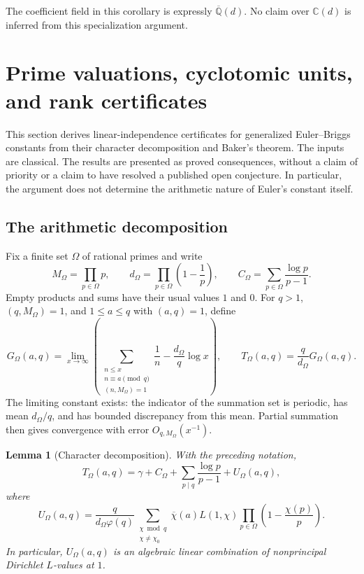 \documentclass[11pt,a4paper]{article}
\newtheorem{lemma}[theorem]{Lemma}
\theoremstyle{definition}
\theoremstyle{remark}
\numberwithin{equation}{section}
\begin{document}
The coefficient field in this corollary is expressly
$\overline{\mathbb Q}(d)$. No claim over $\mathbb C(d)$ is inferred from
this specialization argument.

\section{Prime valuations, cyclotomic units, and rank certificates}
\label{p1:nt-section}

This section derives linear-independence certificates for generalized
Euler--Briggs constants from their character decomposition and Baker's
theorem.  The inputs are classical.  The results are presented as proved
consequences, without a claim of priority or a claim to have resolved a
published open conjecture.  In particular, the argument does not determine
the arithmetic nature of Euler's constant itself.

\subsection{The arithmetic decomposition}
\label{p1:nt-decomposition-section}

Fix a finite set $\Omega$ of rational primes and write
\[
 M_\Omega=\prod_{p\in\Omega}p,
 \qquad d_\Omega=\prod_{p\in\Omega}\left(1-\frac1p\right),
 \qquad C_\Omega=\sum_{p\in\Omega}\frac{\log p}{p-1}.
\]
Empty products and sums have their usual values $1$ and $0$.
For $q>1$, $(q,M_\Omega)=1$, and $1\le a\le q$ with $(a,q)=1$, define
\begin{equation}
\label{p1:nt-generalized-constant}
 G_\Omega(a,q)=
 \lim_{x\to\infty}\left(
 \sum_{\substack{n\le x\\ n\equiv a\pmod q\\(n,M_\Omega)=1}}\frac1n
 -\frac{d_\Omega}{q}\log x\right),
 \qquad
 T_\Omega(a,q)=\frac{q}{d_\Omega}G_\Omega(a,q).
\end{equation}
The limiting constant exists: the indicator of the summation set is
periodic, has mean $d_\Omega/q$, and has bounded discrepancy from this
mean.  Partial summation then gives convergence with error $O_{q,M_\Omega}(x^{-1})$.

\begin{lemma}[Character decomposition]
\label{p1:nt-character-decomposition}
With the preceding notation,
\begin{equation}
\label{p1:nt-normalized-decomposition}
 T_\Omega(a,q)=\gamma+C_\Omega+
 \sum_{p\mid q}\frac{\log p}{p-1}+U_\Omega(a,q),
\end{equation}
where
\begin{equation}
\label{p1:nt-u-definition}
 U_\Omega(a,q)=\frac{q}{d_\Omega\varphi(q)}
 \sum_{\substack{\chi\bmod q\\\chi\ne\chi_0}}
 \overline{\chi}(a)L(1,\chi)
 \prod_{p\in\Omega}\left(1-\frac{\chi(p)}p\right).
\end{equation}
In particular, $U_\Omega(a,q)$ is an algebraic linear combination of
nonprincipal Dirichlet $L$-values at $1$.
\end{lemma}
\end{document}

